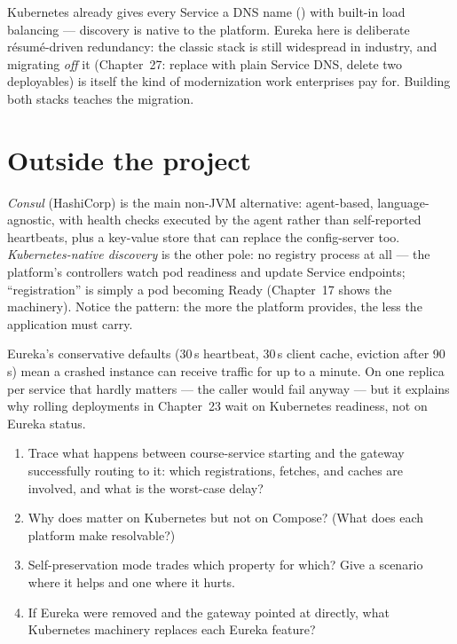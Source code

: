 \begin{decision}
Kubernetes already gives every Service a DNS name
() with built-in load balancing --- discovery is
native to the platform. Eureka here is deliberate résumé-driven
redundancy: the classic stack is still widespread in industry, and
migrating \emph{off} it (Chapter~27: replace  with plain
Service DNS, delete two deployables) is itself the kind of modernization
work enterprises pay for. Building both stacks teaches the migration.
\end{decision}

\section{Outside the project}

\emph{Consul} (HashiCorp) is the main non-JVM alternative: agent-based,
language-agnostic, with health checks executed by the agent rather than
self-reported heartbeats, plus a key-value store that can replace the
config-server too. \emph{Kubernetes-native discovery} is the other pole:
no registry process at all --- the platform's controllers watch pod
readiness and update Service endpoints; ``registration'' is simply a pod
becoming Ready (Chapter~17 shows the machinery). Notice the pattern: the
more the platform provides, the less the application must carry.

\begin{hardware}
Eureka's conservative defaults (30\,s heartbeat, 30\,s client cache,
eviction after 90\,s) mean a crashed instance can receive traffic for up
to a minute. On one replica per service that hardly matters --- the caller
would fail anyway --- but it explains why rolling deployments in
Chapter~23 wait on Kubernetes readiness, not on Eureka status.
\end{hardware}

\begin{quiz}
\begin{enumerate}
  \item Trace what happens between course-service starting and the
  gateway successfully routing to it: which registrations, fetches, and
  caches are involved, and what is the worst-case delay?
  \item Why does  matter on Kubernetes but not on
  Compose? (What does each platform make resolvable?)
  \item Self-preservation mode trades which property for which? Give a
  scenario where it helps and one where it hurts.
  \item If Eureka were removed and the gateway pointed at
   directly, what Kubernetes machinery
  replaces each Eureka feature?
\end{enumerate}
\end{quiz}
